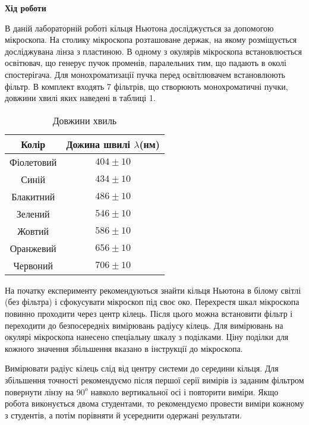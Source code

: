\begin{center}
    \Large{\textbf{Хід роботи}}    
\end{center}

\vspace{1mm}

В даній лабораторній роботі кільця Ньютона досліджується за допомогою
мікроскопа. На столику мікроскопа розташоване держак, на якому розміщується
досліджувана лінза з пластиною. В одному з окулярів мікроскопа 
встановлюється освітювач, що генерує пучок променів, паралельних тим, що падають в
околі спостерігача. Для монохроматизації пучка перед освітлювачем 
встановлюють фільтр. В комплект входять 7 фільтрів, що створюють монохроматичні
пучки, довжини хвилі яких наведені в таблиці 1.

\begin{table}[h]
    \centering
    \begin{tabular}{ |c|c| }
        \hline
        \textbf{Колір} & \textbf{Дожина швилі $\lambda$(нм)} \\
        \hline
        Фіолетовий & $404 \pm 10$ \\
        \hline
        Синій & $434 \pm 10$ \\
        \hline
        Блакитний  & $486 \pm 10$ \\
        \hline
        Зелений & $546 \pm 10$ \\
        \hline
        Жовтий & $586 \pm 10$ \\
        \hline
        Оранжевий & $656 \pm 10$ \\
        \hline
        Червоний & $706 \pm 10$ \\
        \hline
    \end{tabular}
    \caption{Довжини хвиль}
\end{table}


На початку експерименту рекомендуються знайти кільця Ньютона в
білому світлі (без фільтра) і сфокусувати мікроскоп 
під своє око. Перехрестя шкал мікроскопа повинно 
проходити через центр кілець. Після цього
можна встановити фільтр і переходити
до безпосередніх вимірювань радіусу
кілець. Для вимірювань на окулярі мікроскопа
нанесено спеціальну шкалу з поділками. Ціну поділки для кожного
значення збільшення вказано в інструкції до мікроскопа.


Вимірювати радіус кілець слід від центру системи до середини кільця.
Для збільшення точності рекомендуємо після першої серії вимірів із заданим
фільтром повернути лінзу на $90^{o}$ навколо вертикальної осі і повторити виміри.
Якщо робота виконується двома студентами, то рекомендуємо провести виміри
кожному з студентів, а потім порівняти й усереднити одержані результати.

